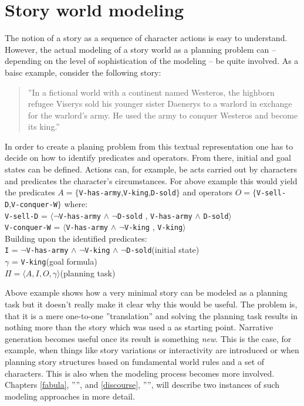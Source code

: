 \section{Story world modeling}\label{modeling}
The notion of a story as a sequence of character actions is easy to understand. However, the actual modeling of a story world as a planning problem can -- depending on the level of sophistication of the modeling -- be quite involved. As a baisc example, consider the following story:
\begin{quote}
''In a fictional world with a continent named Westeros, the highborn refugee Viserys sold his younger sister Daenerys to a warlord in exchange for the warlord's army. He used the army to conquer Westeros and become its king.''
\end{quote}
In order to create a planing problem from this textual representation one has to decide on how to identify predicates and operators. From there, initial and goal states can be defined. Actions can, for example, be acts carried out by characters and predicates the character's circumstances. For above example this would yield the predicates $A=\{$\texttt{V-has-army},\texttt{V-king},\texttt{D-sold}$\}$ and operators $O=\{$\texttt{V-sell-D},\texttt{V-conquer-W}$\}$ where:\\
\texttt{V-sell-D} = $\langle\neg$\texttt{V-has-army} $\land$ $\neg$\texttt{D-sold} ,  \texttt{V-has-army} $\land$ \texttt{D-sold}$\rangle$\\
\texttt{V-conquer-W} = $\langle$\texttt{V-has-army} $\land$ $\neg$\texttt{V-king} ,  \texttt{V-king}$\rangle$\\
Building upon the identified predicates:\\
\texttt{I} = $\neg$\texttt{V-has-army} $\land$ $\neg$\texttt{V-king} $\land$ $\neg$\texttt{D-sold}\hphantom{tabtab}(initial state)\\
\texttt{$\gamma$} = \texttt{V-king}\hphantom{tabtabtabtabtabtabtabtabtabtabtab}(goal formula)\\
$\Pi=\langle A,I,O,\gamma\rangle$\hphantom{tabtabtabtabtabtabtabtabtabtal}(planning task)

Above example shows how a very minimal story can be modeled as a planning task but it doesn't really make it clear why this would be useful. The problem is, that it is a mere one-to-one ''translation'' and solving the planning task results in nothing more than the story which was used a as starting point. Narrative generation becomes useful once its result is something \emph{new}. This is the case, for example, when things like story variations or interactivity are introduced or when planning story structures based on fundamental world rules and a set of characters. This is also when the modeling process becomes more involved. Chapters \ref{fabula}, '''', and \ref{discourse}, '''', will describe two instances of such modeling approaches in more detail.

